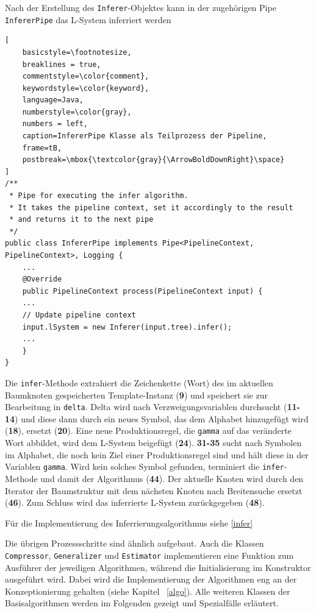 Nach der Erstellung des \texttt{Inferer}-Objektes kann in der zugehörigen Pipe \texttt{InfererPipe} das L-System inferriert
werden
\begin{lstlisting}[
    basicstyle=\footnotesize,
    breaklines = true,
    commentstyle=\color{comment},
    keywordstyle=\color{keyword},
    language=Java,
    numberstyle=\color{gray},
    numbers = left,
    caption=InfererPipe Klasse als Teilprozess der Pipeline,
    frame=tB,
    postbreak=\mbox{\textcolor{gray}{\ArrowBoldDownRight}\space}
]
/**
 * Pipe for executing the infer algorithm.
 * It takes the pipeline context, set it accordingly to the result
 * and returns it to the next pipe
 */
public class InfererPipe implements Pipe<PipelineContext, PipelineContext>, Logging {
    ...
    @Override
    public PipelineContext process(PipelineContext input) {
    ...
    // Update pipeline context
    input.lSystem = new Inferer(input.tree).infer();
    ...
    }
}
\end{lstlisting}

Die \texttt{infer}-Methode extrahiert die Zeichenkette (Wort) des im aktuellen Baumknoten gespeicherten Template-Instanz
(\textbf{9}) und speichert sie zur Bearbeitung in \texttt{delta}.
Delta wird nach Verzweigungsvariablen durchsucht (\textbf{11-14}) und diese dann durch ein neues Symbol,
das dem Alphabet hinzugefügt wird (\textbf{18}), ersetzt (\textbf{20}).
Eine neue Produktionsregel, die \texttt{gamma} auf das veränderte Wort abbildet, wird dem L-System beigefügt (\textbf{24}).
\textbf{31-35} sucht nach Symbolen im Alphabet, die noch kein Ziel einer Produktionsregel sind und hält diese in der
Variablen \texttt{gamma}.
Wird kein solches Symbol gefunden, terminiert die \texttt{infer}-Methode und damit der Algorithmus (\textbf{44}).
Der aktuelle Knoten wird durch den Iterator der Baumstruktur mit dem nächsten Knoten nach Breitensuche ersetzt (\textbf{46}).
Zum Schluss wird das inferrierte L-System zurückgegeben (\textbf{48}).

Für die Implementierung des Inferrierungsalgorithmus siehe \ref{infer}

Die übrigen Prozessschritte sind ähnlich aufgebaut.
Auch die Klassen \texttt{Compressor}, \texttt{Generalizer} und \texttt{Estimator} implementieren eine Funktion zum Ausführer
der jeweiligen Algorithmen, während die Initialisierung im Konstruktor ausgeführt wird.
Dabei wird die Implementierung der Algorithmen eng an der Konzeptionierung gehalten (siehe Kapitel ~\ref{algo}).
Alle weiteren Klassen der Basisalgorithmen werden im Folgenden gezeigt und Spezialfälle erläutert.

